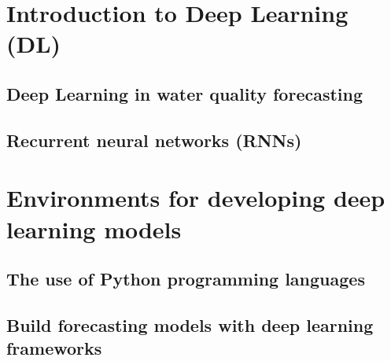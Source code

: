 \section{Introduction to Deep Learning (DL)}
\subsection{Deep Learning in water quality forecasting}

\subsection{Recurrent neural networks (RNNs)}

\section{Environments for developing deep learning models}
\subsection{The use of Python programming languages}

\subsection{Build forecasting models with deep learning frameworks}

